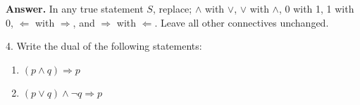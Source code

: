 \documentclass[10pt,]{book}
\theoremstyle{plain}
\theoremstyle{definition}
\theoremstyle{definition}
\theoremstyle{definition}
\theoremstyle{definition}
\begin{document}
\begin{exercisegroup}
\noindent\textbf{Answer.}\hypertarget{answer-10}{}\quad
 In any true statement \(S\), replace; \(\land\) with
 \(\lor\),  \(\lor\) with \(\land\), 0 with 1, 1 with 0, \(\Leftarrow\) with
  \(\Rightarrow \), and \(\Rightarrow \) with \(\Leftarrow \). Leave all other connectives unchanged.%
\item[4.]\hypertarget{exercise-23}{}Write the dual of the following statements:%
\par
\leavevmode%
\begin{enumerate}[label=\alph*]
\item\hypertarget{li-103}{}\((p \land q)\Rightarrow p\)%
\item\hypertarget{li-104}{}\((p\lor q)\land \neg q\Rightarrow p\)%
\end{enumerate}
%
\par\smallskip
\end{exercisegroup}
\par\smallskip\noindent
\typeout{************************************************}
\typeout{************************************************}
\end{document}
